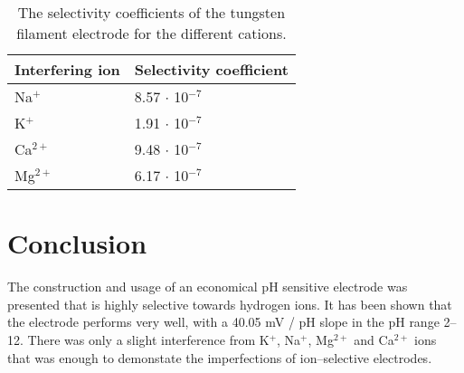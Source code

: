\documentclass[manuscript=article, journal=jceda8]{achemso}
\begin{document}
\begin{comment}
\begin{figure}
\centering
\begin{tikzpicture}
\begin{axis}	[
		legend style={draw=none, at={(0.5,0.98)}, anchor=north},
		xmin=0,
		xmax=660,
		ymin=-500,
		ymax=-50,
		width=12cm,
		height=8cm,
		xlabel=t / s,
		ylabel=E vs. Ag/AgCl/KCl(3 M) / mV
		]
\addplot [color=red, only marks] table {data/calibration/time_dep.csv};
\end{axis}
\end{tikzpicture}
	\caption{A két mikroelektród kalibrációs mérései. Összehasonlításképpen egy üvegelektród egyidejűleg mért potenciál--idő mérését is ábrázoltam. A potenciált mindhárom elektród esetében az üvegelektród belső, Ag/AgCl/KCl (3 M) referencia félcellájához képest mértem egy kellően nagy bemeneti impedanciájú feszültségmérő (eDAQ isopod EPU) felhasználásával.}
\label{fig:kalibracios_meres}
\end{figure}
\end{comment}

\begin{table}[]
\caption{The selectivity coefficients of the tungsten filament electrode for the different cations.}
\label{table:selectivity}
\begin{tabular}{ll}
Interfering ion & Selectivity coefficient \\
\hline
Na$^+$             & 8.57 $\cdot$ 10$^{-7}$              \\
K$^+$              & 1.91 $\cdot$ 10$^{-7}$              \\
Ca$^{2+}$            & 9.48 $\cdot$ 10$^{-7}$              \\
Mg$^{2+}$            & 6.17 $\cdot$ 10$^{-7}$            
\end{tabular}
\end{table}

\section{Conclusion}
	
The construction and usage of an economical pH sensitive electrode was presented that is highly selective towards hydrogen ions. It has been shown that the electrode performs very well, with a 40.05 mV / pH slope in the pH range 2--12. There was only a slight interference from K$^+$, Na$^+$, Mg$^{2+}$ and Ca$^{2+}$ ions that was enough to demonstate the imperfections of ion--selective electrodes.
\end{document}
